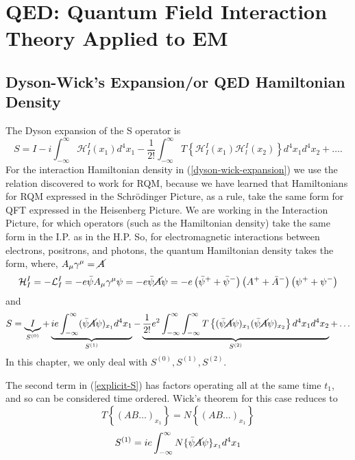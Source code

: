 \chapter{QED: Quantum Field Interaction Theory Applied to EM}
\section{Dyson-Wick's Expansion/or QED Hamiltonian Density}
The Dyson expansion of the S operator is
\begin{equation}
S=I-i \int_{-\infty}^{\infty} \mathcal{H}_{I}^{I}\left(x_{1}\right) d^{4} x_{1}-\frac{1}{2 !} \int_{-\infty}^{\infty} T\left\{\mathcal{H}_{I}^{I}\left(x_{1}\right) \mathcal{H}_{l}^{I}\left(x_{2}\right)\right\} d^{4} x_{1} d^{4} x_{2}+\ldots .
\label{dyson-wick-expansion}
\end{equation}
For the interaction Hamiltonian density in (\ref{dyson-wick-expansion}) we use the relation discovered to work for RQM, because we have learned that Hamiltonians for RQM expressed in the Schrödinger Picture, as a rule, take the same form for QFT expressed in the Heisenberg Picture. We are working in the Interaction Picture, for which operators (such as the Hamiltonian density) take the same form in the I.P. as in the H.P. So, for electromagnetic interactions between electrons, positrons, and photons, the quantum Hamiltonian density takes the form, where, $A_{\mu}\gamma^{\mu}=\cancel{A}$
\begin{equation}
\mathcal{H}_{I}^{I}=-\mathcal{L}_{I}^{I}=-e \bar{\psi} A_{\mu} \gamma^{\mu} \psi=-e \bar{\psi} \cancel{A} \psi=-e\left(\bar{\psi}^{+}+\bar{\psi}^{-}\right)\left(A^{+}+\bar{A}^{-}\right)\left(\psi^{+}+\psi^{-}\right)
\end{equation}
and
\begin{equation}
S=\underbrace{I}_{S^{(0)}} + \underbrace{i e \int_{-\infty}^{\infty}(\bar{\psi} \cancel{A} \psi)_{x_{1}} d^{4} x_{1}}_{S^{(1)}}-\underbrace{\frac{1}{2 !} e^{2} \int_{-\infty}^{\infty} \int_{-\infty}^{\infty} T\left\{(\bar{\psi} \cancel{A} \psi)_{x_{1}}(\bar{\psi} \cancel{A} \psi)_{x_{2}}\right\} d^{4} x_{1} d^{4} x_{2}}_{S^{(2)}}+\dots
\label{explicit-S}
\end{equation}
 In this chapter, we only deal with $S^{(0)},S^{(1)},S^{(2)}$.

The second term in (\ref{explicit-S}) has factors operating all at the same time $t_1$, and so can be considered time ordered. Wick's theorem for this case reduces to
$$T\left\{(A B \ldots)_{x_{1}}\right\}=N\left\{(A B \ldots)_{x_{1}}\right\}$$
$$
S^{(1)}=i e \int_{-\infty}^{\infty} N\{\bar{\psi} \cancel{A} \psi\}_{x_{1}} d^{4} x_{1}
$$
